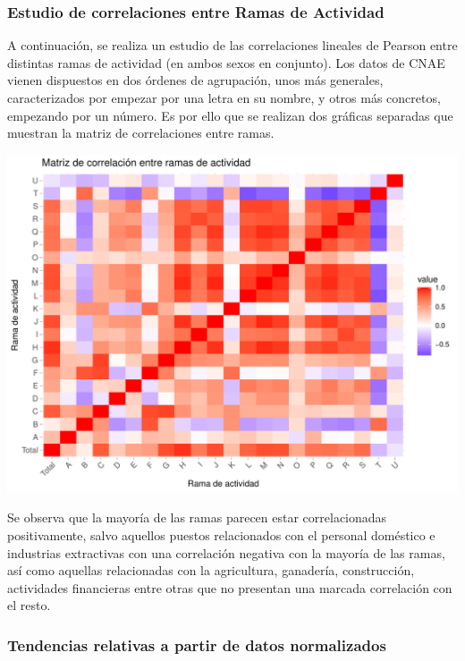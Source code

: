 \documentclass[notspecified,article,submit,moreauthors,pdftex]{Definitions/mdpi}
\begin{document}
\subsubsection{Estudio de correlaciones entre Ramas de
Actividad}\label{estudio-de-correlaciones-entre-ramas-de-actividad}

A continuación, se realiza un estudio de las correlaciones lineales de
Pearson entre distintas ramas de actividad (en ambos sexos en conjunto).
Los datos de CNAE vienen dispuestos en dos órdenes de agrupación, unos
más generales, caracterizados por empezar por una letra en su nombre, y
otros más concretos, empezando por un número. Es por ello que se
realizan dos gráficas separadas que muestran la matriz de correlaciones
entre ramas.

\includegraphics{ProyectoAED2024_files/figure-latex/unnamed-chunk-40-1.pdf}

Se observa que la mayoría de las ramas parecen estar correlacionadas
positivamente, salvo aquellos puestos relacionados con el personal
doméstico e industrias extractivas con una correlación negativa con la
mayoría de las ramas, así como aquellas relacionadas con la agricultura,
ganadería, construcción, actividades financieras entre otras que no
presentan una marcada correlación con el resto.

\subsubsection{Tendencias relativas a partir de datos
normalizados}\label{tendencias-relativas-a-partir-de-datos-normalizados}
\end{document}
